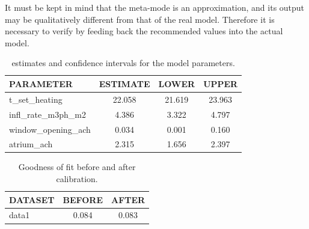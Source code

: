 \documentclass[a4paper]{report}\usepackage[]{graphicx}\usepackage[]{xcolor}
\begin{document}
It must be kept in mind that the meta-mode is an approximation, and its output may be 
	qualitatively different from that of the real model. Therefore it is necessary to verify by feeding back 
	the recommended values into the actual model.
\begin{table}[ht]
\centering
\caption{estimates and confidence intervals for the model parameters.} 
\label{tab:theta}
\begin{tabularx}{\textwidth}{X|ccc}
  \hline
PARAMETER & ESTIMATE & LOWER & UPPER \\ 
  \hline
t\_set\_heating & 22.058 & 21.619 & 23.963 \\ 
  infl\_rate\_m3ph\_m2 & 4.386 & 3.322 & 4.797 \\ 
  window\_opening\_ach & 0.034 & 0.001 & 0.160 \\ 
  atrium\_ach & 2.315 & 1.656 & 2.397 \\ 
   \hline
\end{tabularx}
\end{table}
\begin{table}[ht]
\centering
\caption{Goodness of fit before and after calibration.} 
\label{tab:gof}
\begin{tabularx}{\textwidth}{X|cc}
  \hline
DATASET & BEFORE & AFTER \\ 
  \hline
data1 & 0.084 & 0.083 \\ 
   \hline
\end{tabularx}
\end{table}
\end{document}
